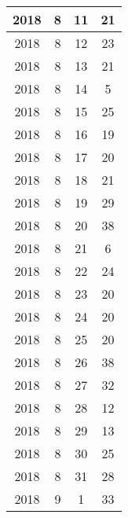 \begin{longtable} {|c|c|c|c|}
\hline
2018         & 8            & 11           & 21                        \\ 
\hline
2018         & 8            & 12           & 23                        \\ 
\hline
2018         & 8            & 13           & 21                        \\ 
\hline
2018         & 8            & 14           & 5                         \\ 
\hline
2018         & 8            & 15           & 25                        \\ 
\hline
2018         & 8            & 16           & 19                        \\ 
\hline
2018         & 8            & 17           & 20                        \\ 
\hline
2018         & 8            & 18           & 21                        \\ 
\hline
2018         & 8            & 19           & 29                        \\ 
\hline
2018         & 8            & 20           & 38                        \\ 
\hline
2018         & 8            & 21           & 6                         \\ 
\hline
2018         & 8            & 22           & 24                        \\ 
\hline
2018         & 8            & 23           & 20                        \\ 
\hline
2018         & 8            & 24           & 20                        \\ 
\hline
2018         & 8            & 25           & 20                        \\ 
\hline
2018         & 8            & 26           & 38                        \\ 
\hline
2018         & 8            & 27           & 32                        \\ 
\hline
2018         & 8            & 28           & 12                        \\ 
\hline
2018         & 8            & 29           & 13                        \\ 
\hline
2018         & 8            & 30           & 25                        \\ 
\hline
2018         & 8            & 31           & 28                        \\ 
\hline
2018         & 9            & 1            & 33                        \\ 

\end{longtable}
